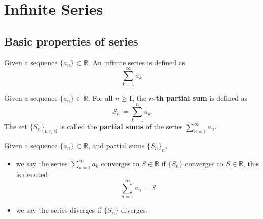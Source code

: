 
\newpage

\section{Infinite Series}

\subsection{Basic properties of series}

\begin{definition}
    Given a sequence $\{ a_n \} \subset \mathbb{R}$.
    An infinite series is defined as
    \[
        \sum\limits_{k = 1}^{\infty}  a_k
    \]
\end{definition}

\begin{definition}
    Given a sequence $\{ a_n \} \subset \mathbb{R}$.
    For all $n \geq 1$,
    the \textbf{$n$-th partial sum} is defined as 
    \[
        S_n \coloneq \sum\limits_{k=1}^{n} a_k
    \]
    The set $\{ S_n \}_{n \in \mathbb{N}} $ is called
    the \textbf{partial sums} of the series $\sum\limits_{n=1}^{\infty} a_n $.
\end{definition}


\begin{definition}
    Given a sequence $\{ a_n \} \subset \mathbb{R}$,
    and partial sums $\{ S_n \}_n$,
    \begin{itemize}
        \item we say the series $\sum\limits_{k=1}^{\infty} a_k$ converges 
        to $S \in \mathbb{R}$
        if $ \{ S_n \} $ converges to $S \in \mathbb{R}$, this is denoted
        \[
            \sum\limits_{n = 1}^{\infty}  a_n = S
        \]
        \item we say the series diverges if $\{ S_n \} $ diverges.
    \end{itemize} 
\end{definition}

